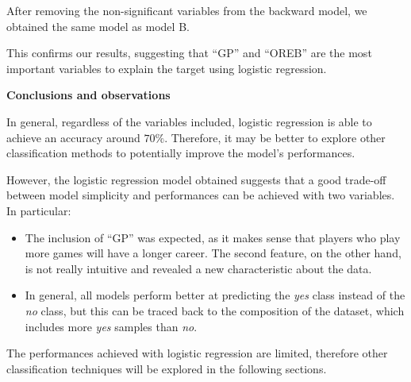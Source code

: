 After removing the non-significant variables from the backward model, we obtained the same model as model B. 

This confirms our results, suggesting that ``GP'' and ``OREB'' are the most important variables to explain the target using logistic regression. 

\vspace{0.2cm}
\noindent
\textbf{Conclusions and observations}

In general, regardless of the variables included, logistic regression is able to achieve an accuracy around $70\%$. Therefore, it may be better to explore other classification methods to potentially improve the model's performances.

However, the logistic regression model obtained suggests that a good trade-off between model simplicity and performances can be achieved with two variables. In particular:

\begin{itemize}
	\item The inclusion of ``GP'' was expected, as it makes sense that players who play more games will have a longer career. The second feature, on the other hand, is not really intuitive and revealed a new characteristic about the data.
	\item In general, all models perform better at predicting the \textit{yes} class instead of the \textit{no} class, but this can be traced back to the composition of the dataset, which includes more \textit{yes} samples than \textit{no}.
\end{itemize}

The performances achieved with logistic regression are limited, therefore other classification techniques will be explored in the following sections.
